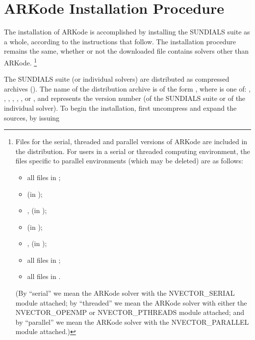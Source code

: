 \documentclass[letterpaper,10pt,english]{sphinxmanual}
\begin{document}
\chapter{ARKode Installation Procedure}
\label{Install:installation}\label{Install:arkode-installation-procedure}\label{Install::doc}
The installation of ARKode is accomplished by installing the SUNDIALS
suite as a whole, according to the instructions that follow.  The
installation procedure remains the same, whether or not the downloaded
file contains solvers other than ARKode. \footnote{
Files for the serial, threaded and parallel versions of
ARKode are included in the distribution. For users in a
serial or threaded computing environment, the files specific
to parallel environments (which may be deleted) are as follows:
\begin{itemize}
\item {} 
all files in ;

\item {} 
 (in );

\item {} 
,  (in
);

\item {} 
 (in );

\item {} 
,  (in );

\item {} 
all files in ;

\item {} 
all files in .

\end{itemize}

(By ``serial'' we mean the ARKode solver with the
NVECTOR\_SERIAL module attached; by ``threaded'' we mean the
ARKode solver with either the NVECTOR\_OPENMP or
NVECTOR\_PTHREADS module attached; and by “parallel” we mean
the ARKode solver with the NVECTOR\_PARALLEL module attached.)
}

The SUNDIALS suite (or individual solvers) are distributed as
compressed archives ().  The name of the distribution
archive is of the form , where  is
one of: , , , , ,
, or , and  represents the version number
(of the SUNDIALS suite or of the individual solver). To begin the
installation, first uncompress and expand the sources, by issuing
\end{document}

